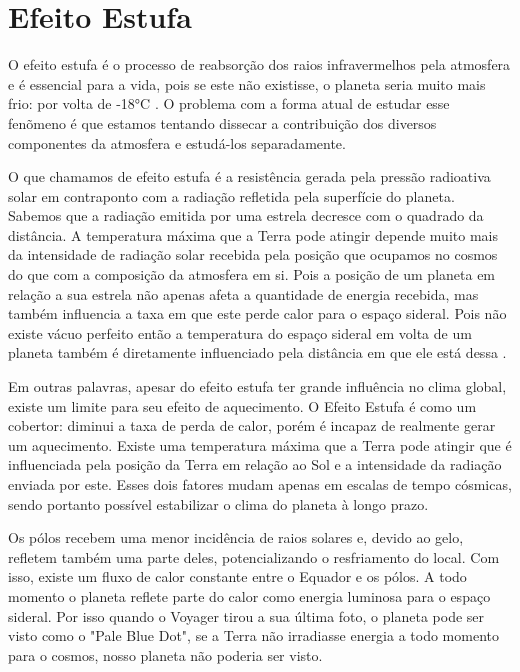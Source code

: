 \chapter[Efeito Estufa]{Efeito Estufa}

O efeito estufa é o processo de reabsorção dos raios infravermelhos pela atmosfera e é essencial para a vida, pois se este não existisse, o planeta seria muito mais frio: por volta de -18°C \cite{Nasa-cold}. O problema com a forma atual de estudar esse fenõmeno é que estamos tentando dissecar a contribuição dos diversos componentes da atmosfera e estudá-los separadamente.

O que chamamos de efeito estufa é a resistência gerada pela pressão radioativa solar em contraponto com a radiação refletida pela superfície do planeta. Sabemos que a radiação emitida por uma estrela decresce com o quadrado da distância. A temperatura máxima que a Terra pode atingir depende muito mais da intensidade de radiação solar recebida pela posição que ocupamos no cosmos do que com a composição da atmosfera em si. Pois a posição de um planeta em relação a sua estrela não apenas afeta a quantidade de energia recebida, mas também influencia a taxa em que este perde calor para o espaço sideral. Pois não existe vácuo perfeito então a temperatura do espaço sideral em volta de um planeta também é diretamente influenciado pela distância em que ele está dessa \cite{cosmic-wave}.

Em outras palavras, apesar do efeito estufa ter grande influência no clima global, existe um limite para seu efeito de aquecimento. O Efeito Estufa é como um cobertor:  diminui a taxa de perda de calor, porém é incapaz de realmente gerar um aquecimento. Existe uma temperatura máxima que a Terra pode atingir que é influenciada pela posição da Terra em relação ao Sol e a intensidade da radiação enviada por este. Esses dois fatores mudam apenas em escalas de tempo cósmicas, sendo portanto possível estabilizar o clima do planeta à longo prazo.

Os pólos recebem uma menor incidência de raios solares e, devido ao gelo, refletem também uma parte deles,  potencializando o resfriamento do local. Com isso, existe um fluxo de calor constante entre o Equador e os pólos. A todo momento o planeta reflete parte do calor como energia luminosa para o espaço sideral. Por isso quando o Voyager tirou a sua última foto, o planeta pode ser visto como o "Pale Blue Dot", se a Terra não irradiasse energia a todo momento para o cosmos, nosso planeta não poderia ser visto.

